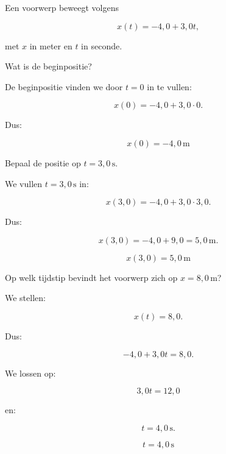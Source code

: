 \documentclass{ximera}
\begin{document}
  \begin{oefening}{\oefB}
  
  Een voorwerp beweegt volgens
  
  \[
  x(t)=-4{,}0+3{,}0t,
  \]
  
  met $x$ in meter en $t$ in seconde.
  
  \begin{question}
  Wat is de beginpositie?
  
  \begin{oplossing}
  De beginpositie vinden we door $t=0$ in te vullen:
  
  \[
  x(0)
  =
  -4{,}0+3{,}0\cdot0.
  \]
  
  Dus:
  
  \[
  \boxed{x(0)=-4{,}0\,\mathrm{m}}
  \]
  \end{oplossing}
  \end{question}
  
  
  \begin{question}
  Bepaal de positie op $t=3{,}0\,\mathrm{s}$.
  
  \begin{oplossing}
  We vullen $t=3{,}0\,\mathrm{s}$ in:
  
  \[
  x(3{,}0)
  =
  -4{,}0+3{,}0\cdot3{,}0.
  \]
  
  Dus:
  
  \[
  x(3{,}0)
  =
  -4{,}0+9{,}0
  =
  5{,}0\,\mathrm{m}.
  \]
  
  \[
  \boxed{x(3{,}0)=5{,}0\,\mathrm{m}}
  \]
  \end{oplossing}
  \end{question}
  
  
  \begin{question}
  Op welk tijdstip bevindt het voorwerp zich op
  $x=8{,}0\,\mathrm{m}$?
  
  \begin{oplossing}
  We stellen:
  
  \[
  x(t)=8{,}0.
  \]
  
  Dus:
  
  \[
  -4{,}0+3{,}0t=8{,}0.
  \]
  
  We lossen op:
  
  \[
  3{,}0t=12{,}0
  \]
  
  en:
  
  \[
  t=4{,}0\,\mathrm{s}.
  \]
  
  \[
  \boxed{t=4{,}0\,\mathrm{s}}
  \]
  \end{oplossing}
  \end{question}
  

\end{oefening}
\end{document}
